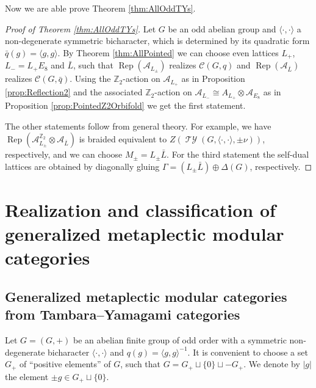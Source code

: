 \documentclass[twoside,11pt,reqno]{amsart}
\theoremstyle{definition}
\theoremstyle{remark}
\newcommand{\cC}{\mathcal{C}}
\newcommand{\A}{\mathcal{A}}
\newcommand{\ZZ}{\mathbb{Z}}
\DeclareMathOperator{\Rep}{Rep}
\DeclareMathOperator*{\TY}{\mathcal{TY}}
\newcommand{\bi}[2]{\langle #1,#2\rangle}
\newcommand{\bislotslot}{\bi\cdot\cdot}
\newcommand{\lattimes}{}%
\begin{document}
Now we are able prove Theorem \ref{thm:AllOddTYs}. 
\begin{proof}[Proof of Theorem \ref{thm:AllOddTYs}]
  Let $G$ be an odd abelian group and $\bislotslot$ a non-degenerate
  symmetric bicharacter, which is determined by its quadratic form 
  $\bar q(g)=\bi gg$.
  By Theorem \ref{thm:AllPointed} we can choose even lattices $L_+$,  
  $L_- = L_+ \lattimes E_8$ and $\bar L$, such that 
  $\Rep(\A_{L_\pm})$ realizes $\cC(G,q)$ and $\Rep(\A_{\bar L})$
  realizes $\cC(G,\bar q)$. 
  Using the $\ZZ_2$-action on $\A_{L_+}$ as in 
    Proposition \ref{prop:Reflection2}  
  and the associated $\ZZ_2$-action on $\A_{L_-}\cong A_{L_+}\otimes \A_{E_8}$     as in Proposition \ref{prop:PointedZ2Orbifold} we get the first statement.
  
  The other statements follow from general theory. 
  For example, we have $\Rep(\A_{L_\pm}^{\ZZ_2}\otimes\A_{\bar L})$ is braided 
  equivalent to $Z(\TY(G,\bislotslot,\pm\nu))$, respectively, and we can choose
  $M_\pm = L_\pm \lattimes \bar L$.
  For the third statement the self-dual lattices are obtained by diagonally 
  gluing $\Gamma=(L_\pm\lattimes \bar L)\oplus \Delta(G)$, respectively.
\end{proof}

%
%
\section{Realization and classification of 
  generalized metaplectic modular categories}
%
\subsection{Generalized metaplectic modular categories from 
  Tambara--Yamagami categories}
\label{ssec:ModularDataMP}
Let $G=(G,+)$ be an abelian finite group of odd order with a 
symmetric non-degenerate
bicharacter $\bislotslot$ and $q(g)=\bi gg ^{-1}$.
%
%
It is convenient to choose a set $G_+$ of ``positive elements'' of $G$, 
such that  $G=G_+\sqcup \{0\} \sqcup -G_+$. 
We denote by $|g|$ the element $\pm g\in G_+\sqcup \{0\}$.
\end{document}
